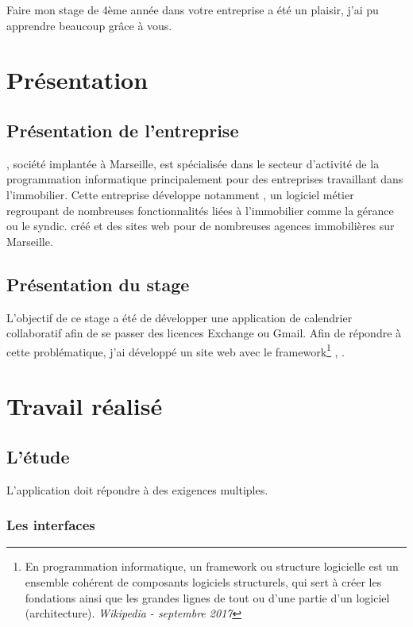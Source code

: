 \documentclass[a4paper, 11pt]{report}
\begin{document}
Faire mon stage de 4ème année dans votre entreprise a été un plaisir, j'ai pu apprendre beaucoup grâce à vous.

\tableofcontents

\chapter{Présentation}
\section{Présentation de l'entreprise}
\logilink, société implantée à Marseille, est spécialisée dans le secteur d'activité de la programmation informatique principalement pour des entreprises travaillant dans l'immobilier. Cette entreprise développe notamment \ulti, un logiciel métier regroupant de nombreuses fonctionnalités liées à l’immobilier comme la gérance ou le syndic. \logilink créé et des sites web pour de nombreuses agences immobilières sur Marseille.

\section{Présentation du stage}
L'objectif de ce stage a été de développer une application de calendrier collaboratif afin de se passer des licences Exchange ou Gmail. Afin de répondre à cette problématique, j'ai développé un site web avec le framework\footnote{En programmation informatique, un framework ou structure logicielle est un ensemble cohérent de composants logiciels structurels, qui sert à créer les fondations ainsi que les grandes lignes de tout ou d'une partie d'un logiciel (architecture). \textit{Wikipedia - septembre 2017}} \php, \symfony.

\chapter{Travail réalisé}
\section{L'étude}
L'application doit répondre à des exigences multiples.
    \subsection{Les interfaces}
\end{document}
